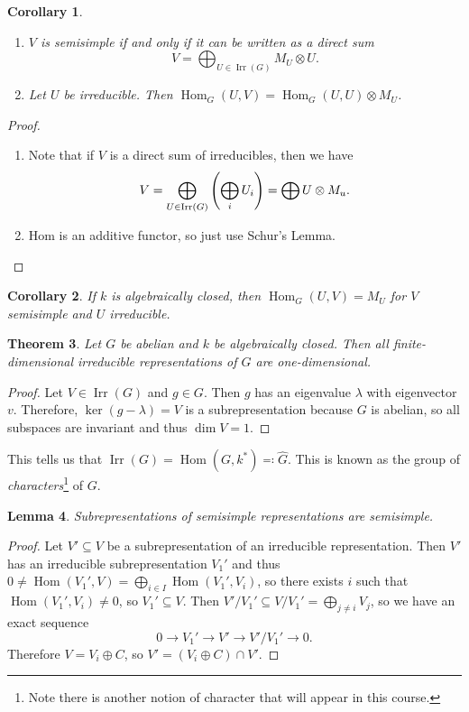\documentclass[leqno, openany]{memoir}
\newtheorem{thm}{Theorem}[chapter]
\newtheorem{cor}[thm]{Corollary}
\newtheorem{lem}[thm]{Lemma}
\theoremstyle{definition}
\theoremstyle{remark}
\theoremstyle{plain}
\theoremstyle{definition}
\theoremstyle{remark}
\newcommand{\wh}[1]{\widehat{#1}}
\DeclareMathOperator{\Irr}{\mathrm{Irr}}
\DeclareMathOperator{\Hom}{Hom}
\begin{document}
\begin{cor} \hfill \begin{enumerate} \item $V$ is semisimple if and only if it
    can be written as a direct sum \[ V = \bigoplus_{U \in \Irr(G)} M_U \otimes
U. \] \item Let $U$ be irreducible. Then $\Hom_G(U,V) = \Hom_G(U,U) \otimes
M_U$.  \end{enumerate} \end{cor}

\begin{proof} \hfill \begin{enumerate} \item Note that if $V$ is a direct sum
    of irreducibles, then we have \[ V = \bigoplus_{U \in\Irr(G)} \qty(
    \bigoplus_{i} U_i ) = \bigoplus U \otimes M_u. \] \item Hom is an additive
    functor, so just use Schur's Lemma.  \end{enumerate} \end{proof}

\begin{cor} If $k$ is algebraically closed, then $\Hom_G(U,V) = M_U$ for $V$
semisimple and $U$ irreducible.  \end{cor}

\begin{thm} Let $G$ be abelian and $k$ be algebraically closed. Then all
finite-dimensional irreducible representations of $G$ are one-dimensional.
\end{thm}

\begin{proof} Let $V \in \Irr(G)$ and $g \in G$. Then $g$ has an eigenvalue
    $\lambda$ with eigenvector $v$. Therefore, $\ker(g - \lambda) = V$ is a
    subrepresentation because $G$ is abelian, so all subspaces are invariant
    and thus $\dim V = 1$.  \end{proof}

This tells us that $\Irr(G) = \Hom(G, k^*) \eqqcolon \wh{G}$. This is known as
the group of \textit{characters}\footnote{Note there is another notion of
character that will appear in this course.} of $G$.

\begin{lem} Subrepresentations of semisimple representations are semisimple.
\end{lem}

\begin{proof} Let $V' \subseteq V$ be a subrepresentation of an irreducible
    representation. Then $V'$ has an irreducible subrepresentation $V_1'$ and
    thus $0 \neq \Hom(V_1', V) = \bigoplus_{i \in I} \Hom(V_1', V_i)$, so there
    exists $i$ such that $\Hom(V_1', V_i) \neq 0$, so $V_1' \subseteq V$. Then
    $V' / V_1' \subseteq V / V_1' = \bigoplus_{j \neq i} V_j$, so we have an
    exact sequence \[ 0 \to V_1' \to V' \to V'/V_1' \to 0. \] Therefore $V =
V_i \oplus C$, so $V' = (V_i \oplus C) \cap V'$.  \end{proof}
\end{document}
